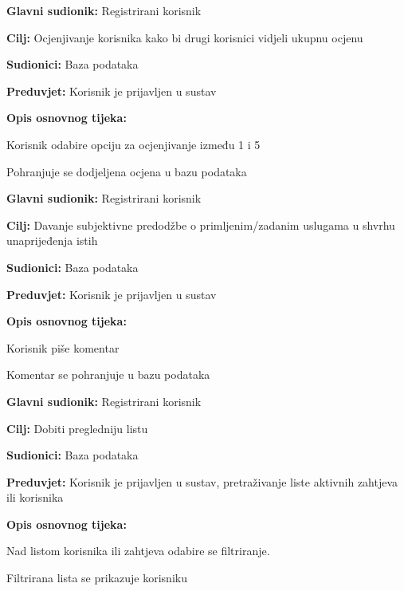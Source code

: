 \noindent {}
\begin{packed_item}
	\item \textbf{Glavni sudionik: } Registrirani korisnik
	\item  \textbf{Cilj:} Ocjenjivanje korisnika kako bi drugi korisnici vidjeli ukupnu ocjenu  
	\item  \textbf{Sudionici:} Baza podataka
	\item  \textbf{Preduvjet:} Korisnik je prijavljen u sustav
	\item  \textbf{Opis osnovnog tijeka:}
	\item[] \begin{packed_enum}
		\item Korisnik odabire opciju za ocjenjivanje između 1 i 5
		\item Pohranjuje se dodjeljena ocjena u bazu podataka
	\end{packed_enum}
\end{packed_item}

\noindent {}
\begin{packed_item}
	\item \textbf{Glavni sudionik: } Registrirani korisnik
	\item  \textbf{Cilj:} Davanje subjektivne predodžbe o primljenim/zadanim uslugama u shvrhu unaprijeđenja istih
	\item  \textbf{Sudionici:} Baza podataka
	\item  \textbf{Preduvjet:} Korisnik je prijavljen u sustav
	\item  \textbf{Opis osnovnog tijeka:}
	\item[] \begin{packed_enum}
		\item Korisnik piše komentar 
		\item Komentar se pohranjuje u bazu podataka
	\end{packed_enum}
\end{packed_item}

\noindent {}
\begin{packed_item}
	\item \textbf{Glavni sudionik: } Registrirani korisnik
	\item  \textbf{Cilj:} Dobiti pregledniju listu 
	\item  \textbf{Sudionici:} Baza podataka
	\item  \textbf{Preduvjet:} Korisnik je prijavljen u sustav, pretraživanje liste aktivnih zahtjeva ili korisnika
	\item  \textbf{Opis osnovnog tijeka:}
	\item[] \begin{packed_enum}
		\item Nad listom korisnika ili zahtjeva odabire se filtriranje.
		\item Filtrirana lista se prikazuje korisniku
	\end{packed_enum}
\end{packed_item}

